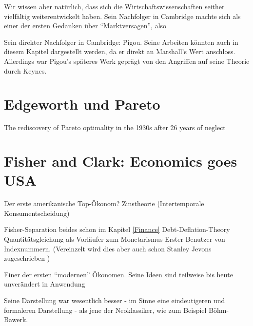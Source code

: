 Wir wissen aber natürlich, dass sich die Wirtschaftswissenschaften seither vielfältig weiterentwickelt haben.  Sein Nachfolger in Cambridge machte sich als einer der ersten Gedanken über "`Marktversagen"', also 



Sein direkter Nachfolger in Cambridge: Pigou. Seine Arbeiten könnten auch in diesem Kapitel dargestellt werden, da er direkt an Marshall's Wert anschloss. Allerdings war Pigou's späteres Werk geprägt von den Angriffen auf seine Theorie durch Keynes. 







\section{Edgeworth und Pareto}
The rediscovery of Pareto optimality in the 1930s after
26 years of neglect \textcite[S. 148]{Blaug2001}





\section{Fisher and Clark: Economics goes USA}
Der erste amerikanische Top-Ökonom?
Zinstheorie (Intertemporale Konsumentscheidung)

Fisher-Separation
beides schon im Kapitel \ref{Finance}
Debt-Deflation-Theory
Quantitätsgleichung als Vorläufer zum Monetarismus
Erster Benutzer von Indexnummern. (Vereinzelt wird dies aber auch schon Stanley Jevons zugeschrieben \parencite[S. 232]{Jevons1934})

Einer der ersten "`modernen"' Ökonomen. Seine Ideen sind teilweise bis heute unverändert in Anwendung

Seine Darstellung war wesentlich besser - im Sinne eine eindeutigeren und formaleren Darstellung - als jene der Neoklassiker, wie zum Beispiel Böhm-Bawerk.


\textcite{Tobin2005}